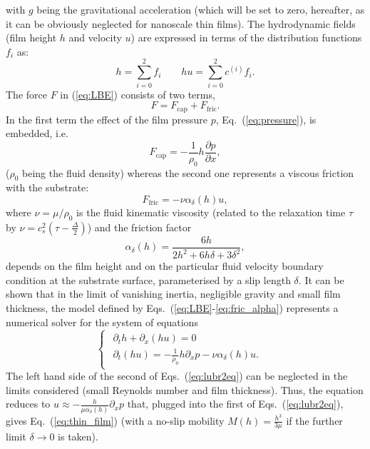 with $g$ being the gravitational acceleration (which will be 
set to zero, hereafter, as it can be obviously neglected for nanoscale thin films).
The hydrodynamic fields (film height $h$ and velocity $u$) are expressed in terms of the 
distribution functions $f_i$ as:
\begin{equation}\label{eq:hydrofields}
h= \sum_{i=0}^2 f_i \qquad hu = \sum_{i=0}^2 c^{(i)} f_i.
\end{equation}
The force $F$ in (\ref{eq:LBE}) consists of two terms,
\begin{equation}\label{eq:force}
F = F_{\text{cap}} + F_{\text{fric}}.  
\end{equation}
In the first term the effect of the film pressure $p$, Eq.~(\ref{eq:pressure}), is 
embedded, i.e. 
\begin{equation}\label{eq:capillary_force}
    F_{\text{cap}} = -\frac{1}{\rho_0} h \frac{\partial p}{\partial x},
\end{equation}
($\rho_0$ being the fluid density) whereas the second one represents a viscous friction with the substrate:
\begin{equation}\label{eq:fric_force}
    F_{\text{fric}} = -\nu \alpha_{\delta}(h) u,
\end{equation}
where $\nu=\mu/\rho_0$ is the fluid kinematic viscosity (related to the relaxation time $\tau$ by $\nu = c_s^2\left(\tau-\frac{\Delta}{2}\right)$) and the friction factor
\begin{equation}\label{eq:fric_alpha}
     \alpha_{\delta}(h) = \frac{6 h}{2h^2 + 6h\delta + 3\delta^2},
\end{equation}
depends on the film height and on the particular fluid velocity boundary 
condition at the substrate surface, parameterised by a slip length $\delta$.
It can be shown that in the limit of vanishing inertia, negligible gravity and small film thickness, the model defined by Eqs.~(\ref{eq:LBE}-\ref{eq:fric_alpha})
represents a numerical solver for the system of equations
\begin{equation}\label{eq:lubr2eq}
\begin{cases}
\begin{array}{ll}
\partial_t h + \partial_x (h u)  = 0 & \\ 
\partial_t (h u) = -\frac{1}{\rho_0}h\partial_x p -\nu\alpha_{\delta}(h)u.
\end{array}
\end{cases}
\end{equation}
The left hand side of the second of Eqs.~(\ref{eq:lubr2eq}) can be neglected in the limits considered (small Reynolds number and film thickness). Thus, 
the equation reduces to $u \approx -\frac{h}{\mu\alpha_{\delta}(h)}\partial_x p$ that, plugged into the first of Eqs.~(\ref{eq:lubr2eq}), gives Eq.~(\ref{eq:thin_film}) 
(with a no-slip mobility $M(h)=\frac{h^3}{3\mu}$ if the further limit $\delta \rightarrow 0$ is taken).

